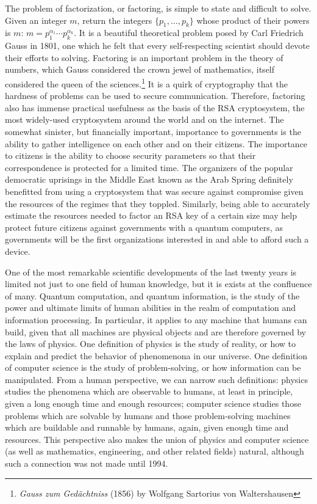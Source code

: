 The problem of factorization, or factoring,
is simple to state and difficult to solve.
Given an integer $m$, return the integers $\{p_1, \ldots, p_k\}$ whose
product of their powers is $m$: $m = p_1^{\alpha_1}\cdots p_k^{\alpha_k}$.
It is a beautiful theoretical problem posed by Carl Friedrich Gauss in 1801,
one which he felt that every self-respecting scientist should devote their
efforts to solving. Factoring is an important problem in the theory of
numbers, which Gauss considered the crown jewel of mathematics, itself
considered the queen of the sciences.\footnote{\emph{Gauss zum Ged\"achtniss} (1856) by Wolfgang Sartorius von Waltershausen}
It is a quirk of cryptography that the hardness of problems can be used
to secure communication. Therefore, factoring also has immense practical
usefulness as the basis of the RSA cryptosystem, the most widely-used
cryptosystem around the world and on the internet. The somewhat sinister,
but financially important, importance to
governments is the ability to gather intelligence on each other and on their
citizens. The importance to citizens is the ability to choose security
parameters so that their correspondence is protected for a limited time.
The organizers of the popular democratic uprisings in the Middle East known
as the Arab Spring definitely benefitted from using a cryptosystem that was
secure against compromise given the resources of the regimes that they toppled.
Similarly, being able to accurately estimate the resources needed to factor
an RSA key of a certain size may help protect future citizens against
governments with a quantum computers, as governments will be the first
organizations interested in and able to afford such a device.

One of the most remarkable scientific developments of the last twenty years is
 limited not just to one field of human knowledge, but it is exists at the
 confluence of many. Quantum computation, and quantum information, is the
 study of the power and ultimate limits of human abilities in the realm of
 computation and information processing. In particular, it applies to any
 machine that humans can build, given that all machines are physical objects
 and are therefore governed by the laws of physics. One definition of physics
 is the study of reality, or how to explain and predict the behavior of
 phenomenona in our universe. One definition of computer science is the study
 of problem-solving, or how information can be manipulated. From a human
 perspective, we can narrow such definitions: physics studies the phenomena
 which are observable to humans, at least in principle, given a long enough
 time and enough resources; computer science studies those problems which are
 solvable by humans and those problem-solving machines which are buildable
 and runnable by humans, again, given enough time and resources.
 This perspective also makes the union of physics and computer science
 (as well as mathematics, engineering, and other related fields) natural,
 although such a connection was not made until 1994.

